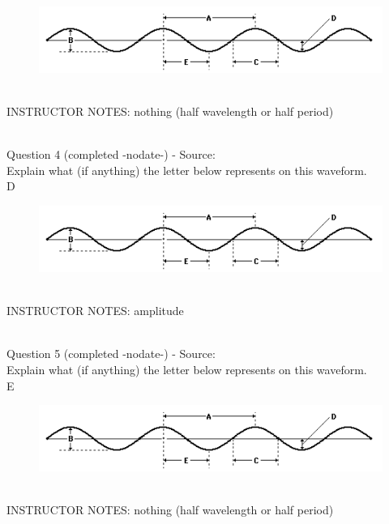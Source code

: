 \documentclass[12pt]{article}
\begin{document}
\begin{figure}[H]
\includegraphics{../images/sinusoid.png}
\end{figure}

~\\
INSTRUCTOR NOTES: nothing (half wavelength or half period)


~\\

{\large Question 4} (completed -nodate-) - Source: \\

Explain what (if anything) the letter below represents on this waveform.\\

D

\begin{figure}[H]
\includegraphics{../images/sinusoid.png}
\end{figure}

~\\
INSTRUCTOR NOTES: amplitude


~\\

{\large Question 5} (completed -nodate-) - Source: \\

Explain what (if anything) the letter below represents on this waveform.\\

E

\begin{figure}[H]
\includegraphics{../images/sinusoid.png}
\end{figure}

~\\
INSTRUCTOR NOTES: nothing (half wavelength or half period)
\end{document}
